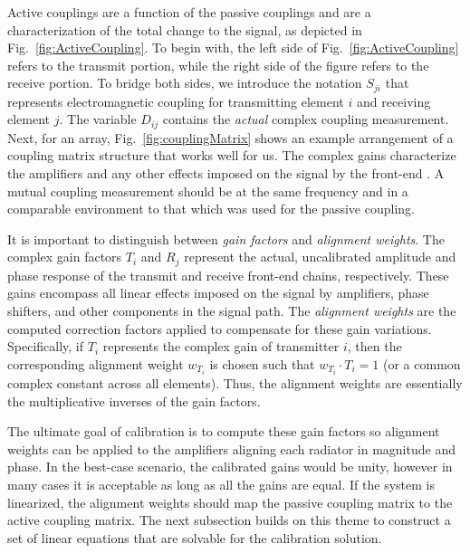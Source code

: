\documentclass[journal]{IEEEtran}
\begin{document}

Active couplings are a function of the passive couplings and are a characterization of the total change to the signal, as depicted in Fig.~\ref{fig:ActiveCoupling}.  To begin with, the left side of Fig.~\ref{fig:ActiveCoupling} refers to the transmit portion, while the right side of the figure refers to the receive portion.  To bridge both sides, we introduce the notation $S_{ji}$ that represents electromagnetic coupling for transmitting element $i$ and receiving element $j$.  The variable $D_{ij}$ contains the {\em actual} complex coupling measurement. Next, for an array, Fig.~\ref{fig:couplingMatrix} shows an example arrangement of a coupling matrix structure that works well for us. 
The complex gains characterize the amplifiers and any other effects imposed on the signal by the front-end \cite{seker,lebron}. A mutual coupling measurement should be at the same frequency and in a comparable environment to that which was used for the passive coupling.

It is important to distinguish between \emph{gain factors} and \emph{alignment weights}. The complex gain factors $T_i$ and $R_j$ represent the actual, uncalibrated amplitude and phase response of the transmit and receive front-end chains, respectively. These gains encompass all linear effects imposed on the signal by amplifiers, phase shifters, and other components in the signal path. The \emph{alignment weights} are the computed correction factors applied to compensate for these gain variations. Specifically, if $T_i$ represents the complex gain of transmitter $i$, then the corresponding alignment weight $w_{T_i}$ is chosen such that $w_{T_i} \cdot T_i = 1$ (or a common complex constant across all elements). Thus, the alignment weights are essentially the multiplicative inverses of the gain factors.

The ultimate goal of calibration is to compute these gain factors so alignment weights can be applied to the amplifiers aligning each radiator in magnitude and phase. In the best-case scenario, the calibrated gains would be unity, however in many cases it is acceptable as long as all the gains are equal. If the system is linearized, the alignment weights should map the passive coupling matrix to the active coupling matrix.
The next subsection builds on this theme to construct a set of linear equations that are solvable for the calibration solution. 
\end{document}
